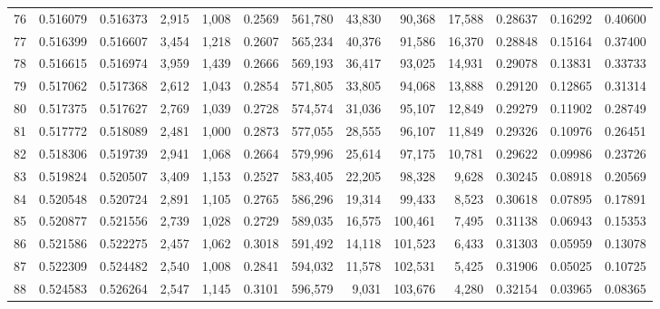 \begin{tabular}{rrrrrrrrrrrrr}
76 &  0.516079 &  0.516373 &   2,915 &  1,008 &                                     0.2569 &  561,780 &   43,830 &   90,368 &   17,588 &  0.28637 &  0.16292 &  0.40600 \\
77 &  0.516399 &  0.516607 &   3,454 &  1,218 &                                     0.2607 &  565,234 &   40,376 &   91,586 &   16,370 &  0.28848 &  0.15164 &  0.37400 \\
78 &  0.516615 &  0.516974 &   3,959 &  1,439 &                                     0.2666 &  569,193 &   36,417 &   93,025 &   14,931 &  0.29078 &  0.13831 &  0.33733 \\
79 &  0.517062 &  0.517368 &   2,612 &  1,043 &                                     0.2854 &  571,805 &   33,805 &   94,068 &   13,888 &  0.29120 &  0.12865 &  0.31314 \\
80 &  0.517375 &  0.517627 &   2,769 &  1,039 &                                     0.2728 &  574,574 &   31,036 &   95,107 &   12,849 &  0.29279 &  0.11902 &  0.28749 \\
81 &  0.517772 &  0.518089 &   2,481 &  1,000 &                                     0.2873 &  577,055 &   28,555 &   96,107 &   11,849 &  0.29326 &  0.10976 &  0.26451 \\
82 &  0.518306 &  0.519739 &   2,941 &  1,068 &                                     0.2664 &  579,996 &   25,614 &   97,175 &   10,781 &  0.29622 &  0.09986 &  0.23726 \\
83 &  0.519824 &  0.520507 &   3,409 &  1,153 &                                     0.2527 &  583,405 &   22,205 &   98,328 &    9,628 &  0.30245 &  0.08918 &  0.20569 \\
84 &  0.520548 &  0.520724 &   2,891 &  1,105 &                                     0.2765 &  586,296 &   19,314 &   99,433 &    8,523 &  0.30618 &  0.07895 &  0.17891 \\
85 &  0.520877 &  0.521556 &   2,739 &  1,028 &                                     0.2729 &  589,035 &   16,575 &  100,461 &    7,495 &  0.31138 &  0.06943 &  0.15353 \\
86 &  0.521586 &  0.522275 &   2,457 &  1,062 &                                     0.3018 &  591,492 &   14,118 &  101,523 &    6,433 &  0.31303 &  0.05959 &  0.13078 \\
87 &  0.522309 &  0.524482 &   2,540 &  1,008 &                                     0.2841 &  594,032 &   11,578 &  102,531 &    5,425 &  0.31906 &  0.05025 &  0.10725 \\
88 &  0.524583 &  0.526264 &   2,547 &  1,145 &                                     0.3101 &  596,579 &    9,031 &  103,676 &    4,280 &  0.32154 &  0.03965 &  0.08365 \\

\end{tabular}
